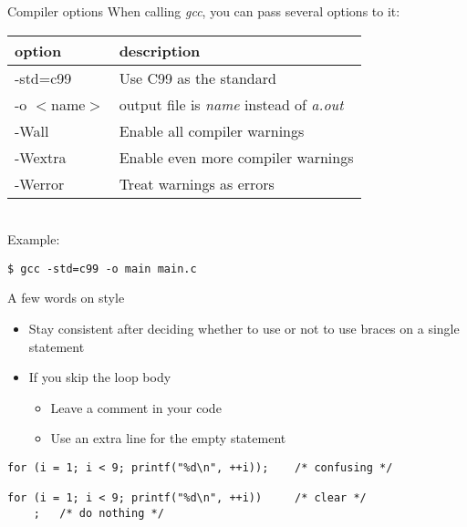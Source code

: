 \begin{frame}[fragile]{Compiler options}
	When calling \textit{gcc}, you can pass several options to it:\\
	\bigskip
	\begin{tabular}{|l|l|}
		\hline
		\textbf{option} & \textbf{description} \\\hline
		-std=c99 & Use C99 as the standard \\\hline
		-o $<$name$>$ & output file is \textit{name} instead of \textit{a.out} \\\hline
		-Wall & Enable all compiler warnings \\\hline
		-Wextra & Enable even more compiler warnings \\\hline
		-Werror & Treat warnings as errors \\\hline
	\end{tabular}\\
	\bigskip
	Example:
	\begin{lstlisting}[numbers=none]
$ gcc -std=c99 -o main main.c
\end{lstlisting}
\end{frame}

\begin{frame}[fragile]{A few words on style}
	\begin{itemize}
        \item Stay consistent after deciding whether to use or not to use braces on a single statement
		\item If you skip the loop body
		\begin{itemize}
			\item Leave a comment in your code
			\item Use an extra line for the empty statement
		\end{itemize}
	\end{itemize}
		\begin{lstlisting}[numbers=none]
for (i = 1; i < 9; printf("%d\n", ++i));	/* confusing */

for (i = 1; i < 9; printf("%d\n", ++i))		/* clear */
	;	/* do nothing */
\end{lstlisting}
\end{frame}


